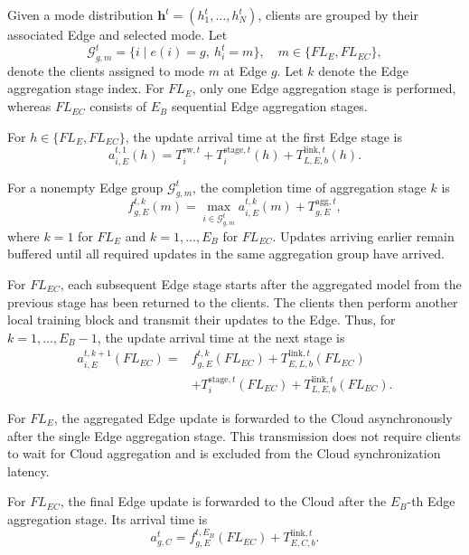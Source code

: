 \documentclass[5p,times]{elsarticle}
\theoremstyle{plain}
\theoremstyle{definition}
\theoremstyle{remark}
\begin{document}
Given a mode distribution
$\mathbf h^t=(h_1^t,\ldots,h_N^t)$,
clients are grouped by their associated Edge
and selected mode. Let
\begin{equation}
\mathcal G_{g,m}^t
=\{i\mid e(i)=g,\ h_i^t=m\},
\quad m\in\{FL_E,FL_{EC}\},
\label{eq:edge_mode_group}
\end{equation}
denote the clients assigned to mode $m$
at Edge $g$. Let \(k\) denote the
Edge aggregation stage index. For \(FL_E\),
only one Edge aggregation stage is performed,
whereas \(FL_{EC}\) consists of \(E_B\)
sequential Edge aggregation stages.

For \(h\in\{FL_E,FL_{EC}\}\), the update
arrival time at the first Edge stage is
\begin{equation}
a_{i,E}^{t,1}(h)
=
T_i^{\mathrm{sw},t}
+
T_i^{\mathrm{stage},t}(h)
+
T_{L,E,b}^{\mathrm{link},t}(h).
\end{equation}

For a nonempty Edge group
$\mathcal G_{g,m}^t$, the completion time
of aggregation stage $k$ is
\begin{equation}
f_{g,E}^{t,k}(m)
=
\max_{i\in\mathcal G_{g,m}^t}
a_{i,E}^{t,k}(m)
+
T_{g,E}^{\mathrm{agg},t},
\label{eq:edge_agg_finish}
\end{equation}
where $k=1$ for $FL_E$ and
$k=1,\ldots,E_B$ for $FL_{EC}$.
Updates arriving earlier remain buffered
until all required updates in the same
aggregation group have arrived.

For \(FL_{EC}\), each subsequent Edge stage
starts after the aggregated model from the
previous stage has been returned to the
clients. The clients then perform another
local training block and transmit their
updates to the Edge. Thus, for
\(k=1,\ldots,E_B-1\), the update arrival
time at the next stage is
\begin{equation}
\begin{aligned}
a_{i,E}^{t,k+1}(FL_{EC})
={}&f_{g,E}^{t,k}(FL_{EC})
+T_{E,L,b}^{\mathrm{link},t}(FL_{EC})\\
&+T_i^{\mathrm{stage},t}(FL_{EC})
+T_{L,E,b}^{\mathrm{link},t}(FL_{EC}).
\end{aligned}
\end{equation}

For \(FL_E\), the aggregated Edge update is
forwarded to the Cloud asynchronously after
the single Edge aggregation stage. This
transmission does not require clients to wait
for Cloud aggregation and is excluded from
the Cloud synchronization latency.

For \(FL_{EC}\), the final Edge update is
forwarded to the Cloud after the \(E_B\)-th
Edge aggregation stage. Its arrival time is
\begin{equation}
a_{g,C}^t
=
f_{g,E}^{t,E_B}(FL_{EC})
+
T_{E,C,b}^{\mathrm{link},t}.
\end{equation}
\end{document}
